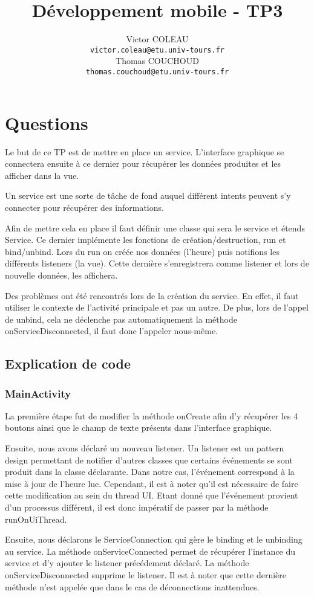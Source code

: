 \documentclass{report}
\title{Développement mobile - TP3}
\author{Victor COLEAU\\\texttt{victor.coleau@etu.univ-tours.fr}\\Thomas COUCHOUD\\\texttt{thomas.couchoud@etu.univ-tours.fr}}
\begin{document}
	\mccTitle
	
	\chapter{Questions}
		Le but de ce TP est de mettre en place un service. 
		L'interface graphique se connectera ensuite à ce dernier pour récupérer les données produites et les afficher dans la vue.
		
		Un service est une sorte de tâche de fond auquel différent intents peuvent s'y connecter pour récupérer des informations.
		
		Afin de mettre cela en place il faut définir une classe qui sera le service et étends Service.
		Ce dernier implémente les fonctions de création/destruction, run et bind/unbind.
		Lors du run on créée nos données (l'heure) puis notifions les différents listeners (la vue).
		Cette dernière s'enregistrera comme listener et lors de nouvelle données, les affichera.
		
		Des problèmes ont été rencontrés lors de la création du service.
		En effet, il faut utiliser le contexte de l'activité principale et pas un autre.
		De plus, lors de l'appel de unbind, cela ne déclenche pas automatiquement la méthode onServiceDisconnected, il faut donc l'appeler nous-même.

	\section{Explication de code}
		\subsection{MainActivity}
			La première étape fut de modifier la méthode onCreate afin d'y récupérer les 4 boutons ainsi que le champ de texte présents dans l'interface graphique.
	
			Ensuite, nous avons déclaré un nouveau listener.
			Un listener est un pattern design permettant de notifier d'autres classes que certains événements se sont produit dans la classe déclarante.
			Dans notre cas, l'événement correspond à la mise à jour de l'heure lue.
			Cependant, il est à noter qu'il est nécessaire de faire cette modification au sein du thread UI.
			Etant donné que l'événement provient d'un processus différent, il est donc impératif de passer par la méthode runOnUiThread.
	
			Ensuite, nous déclarons le ServiceConnection qui gère le binding et le unbinding au service.
			La méthode onServiceConnected permet de récupérer l'instance du service et d'y ajouter le listener précédement déclaré.
			La méthode onServiceDisconnected supprime le listener.
			Il est à noter que cette dernière méthode n'est appelée que dans le cas de déconnections inattendues.
	
\end{document}
